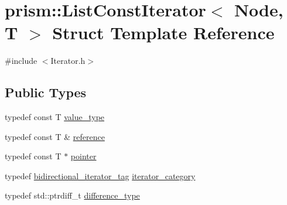 \hypertarget{structprism_1_1_list_const_iterator}{}\section{prism\+:\+:List\+Const\+Iterator$<$ Node, T $>$ Struct Template Reference}
\label{structprism_1_1_list_const_iterator}


{\ttfamily \#include $<$Iterator.\+h$>$}

\subsection*{Public Types}
\begin{DoxyCompactItemize}
\item 
typedef const T \hyperlink{structprism_1_1_list_const_iterator_adfd43e41c11c067d81279589a424b5a2}{value\+\_\+type}
\item 
typedef const T \& \hyperlink{structprism_1_1_list_const_iterator_ad35238dd195319f3f07c12769b52b472}{reference}
\item 
typedef const T $\ast$ \hyperlink{structprism_1_1_list_const_iterator_a1c92e5a7b7d0a92c744027ca421cb651}{pointer}
\item 
typedef \hyperlink{structprism_1_1bidirectional__iterator__tag}{bidirectional\+\_\+iterator\+\_\+tag} \hyperlink{structprism_1_1_list_const_iterator_a6cf9898af1bc61457d9f8331a95bb1fa}{iterator\+\_\+category}
\item 
typedef std\+::ptrdiff\+\_\+t \hyperlink{structprism_1_1_list_const_iterator_a16d9c896e7353dc34db8cd8e0edbf40d}{difference\+\_\+type}
\end{DoxyCompactItemize}
